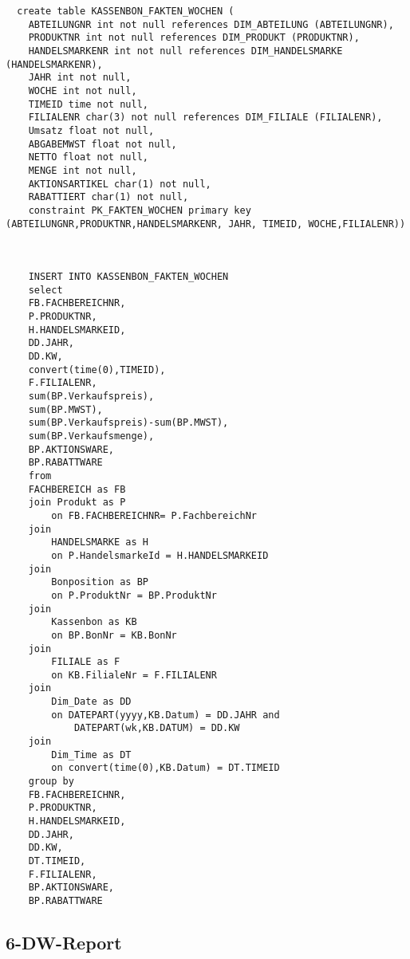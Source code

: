 \begin{lstlisting}
  create table KASSENBON_FAKTEN_WOCHEN (
	ABTEILUNGNR int not null references DIM_ABTEILUNG (ABTEILUNGNR),
	PRODUKTNR int not null references DIM_PRODUKT (PRODUKTNR),
	HANDELSMARKENR int not null references DIM_HANDELSMARKE (HANDELSMARKENR),
	JAHR int not null,
	WOCHE int not null,
    TIMEID time not null,
	FILIALENR char(3) not null references DIM_FILIALE (FILIALENR),
	Umsatz float not null,
	ABGABEMWST float not null,
	NETTO float not null,
	MENGE int not null,
	AKTIONSARTIKEL char(1) not null,
	RABATTIERT char(1) not null,
	constraint PK_FAKTEN_WOCHEN primary key (ABTEILUNGNR,PRODUKTNR,HANDELSMARKENR, JAHR, TIMEID, WOCHE,FILIALENR))



	INSERT INTO KASSENBON_FAKTEN_WOCHEN
	select
	FB.FACHBEREICHNR,
	P.PRODUKTNR,
	H.HANDELSMARKEID,
	DD.JAHR,
	DD.KW,
    convert(time(0),TIMEID),
	F.FILIALENR,
	sum(BP.Verkaufspreis),
	sum(BP.MWST),
	sum(BP.Verkaufspreis)-sum(BP.MWST),
	sum(BP.Verkaufsmenge),
	BP.AKTIONSWARE,
	BP.RABATTWARE
	from
	FACHBEREICH as FB
	join Produkt as P
		on FB.FACHBEREICHNR= P.FachbereichNr
	join
		HANDELSMARKE as H
		on P.HandelsmarkeId = H.HANDELSMARKEID
	join
		Bonposition as BP
		on P.ProduktNr = BP.ProduktNr
	join
		Kassenbon as KB
		on BP.BonNr = KB.BonNr
	join
		FILIALE as F
		on KB.FilialeNr = F.FILIALENR
	join
		Dim_Date as DD
		on DATEPART(yyyy,KB.Datum) = DD.JAHR and
			DATEPART(wk,KB.DATUM) = DD.KW
	join
		Dim_Time as DT
		on convert(time(0),KB.Datum) = DT.TIMEID
	group by
	FB.FACHBEREICHNR,
	P.PRODUKTNR,
	H.HANDELSMARKEID,
	DD.JAHR,
	DD.KW,
    DT.TIMEID,
	F.FILIALENR,
	BP.AKTIONSWARE,
	BP.RABATTWARE
\end{lstlisting}



\subsection{6-DW-Report}

